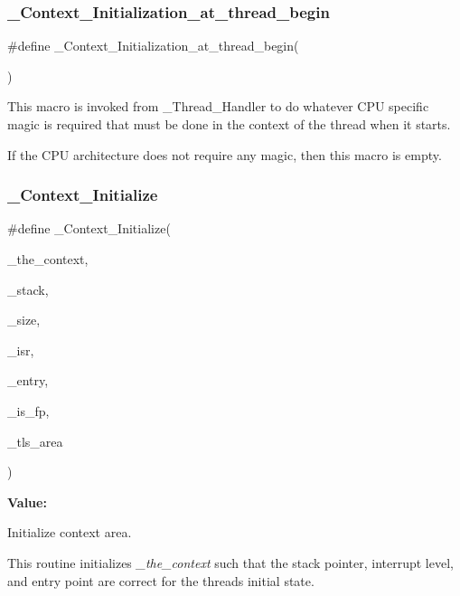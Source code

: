 \subsubsection{\texorpdfstring{\_Context\_Initialization\_at\_thread\_begin}{\_Context\_Initialization\_at\_thread\_begin}}
{\footnotesize\ttfamily \#define \+\_\+\+Context\+\_\+\+Initialization\+\_\+at\+\_\+thread\+\_\+begin(\begin{DoxyParamCaption}{ }\end{DoxyParamCaption})}

This macro is invoked from \+\_\+\+Thread\+\_\+\+Handler to do whatever C\+PU specific magic is required that must be done in the context of the thread when it starts.

If the C\+PU architecture does not require any magic, then this macro is empty. \mbox{\label{group__RTEMSScoreContext_ga58ee7a020994c31e741b3c431eea168e}} 
\subsubsection{\texorpdfstring{\_Context\_Initialize}{\_Context\_Initialize}}
{\footnotesize\ttfamily \#define \+\_\+\+Context\+\_\+\+Initialize(\begin{DoxyParamCaption}\item[{}]{\+\_\+the\+\_\+context,  }\item[{}]{\+\_\+stack,  }\item[{}]{\+\_\+size,  }\item[{}]{\+\_\+isr,  }\item[{}]{\+\_\+entry,  }\item[{}]{\+\_\+is\+\_\+fp,  }\item[{}]{\+\_\+tls\+\_\+area }\end{DoxyParamCaption})}

{\bfseries Value\+:}
\begin{DoxyCode}{0}

\end{DoxyCode}


Initialize context area. 

This routine initializes {\itshape \+\_\+the\+\_\+context} such that the stack pointer, interrupt level, and entry point are correct for the thread\textquotesingle{}s initial state.



